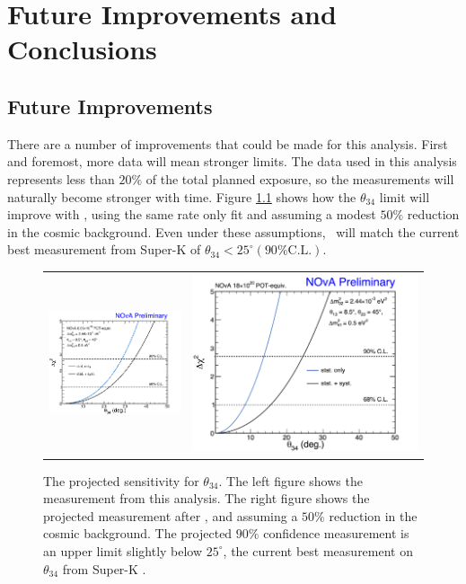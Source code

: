 \chapter{Future Improvements and Conclusions}
\label{conclusion}

\section{Future Improvements}
\label{sec:Future}

There are a number of improvements that could be made for this analysis. First and foremost, more data will mean stronger limits. The data used in this analysis represents less than $20\%$ of the total planned exposure, so the measurements will naturally become stronger with time. Figure \ref{fig:Fit3yr} shows how the $\theta_{34}$ limit will improve with , using the same rate only fit and assuming a modest $50\%$ reduction in the cosmic background. Even under these assumptions, \nova~will match the current best measurement from Super-K \cite{ref:SuperKSterile} of $\theta_{34} < 25^\circ (90\% \mbox{C.L.})$.
\begin{figure}[htb]
  \centering
  \begin{tabular}{c c}
    \includegraphics[width=.47\textwidth]{figures/Fits/1DTh34.png} &
    \includegraphics[width=.47\textwidth]{figures/Fits/1DTh34_3yr.png} \\
  \end{tabular}
  \caption[Projected Sensitivity for $\theta_{34}$ After .]{The projected sensitivity for $\theta_{34}$. The left figure shows the measurement from this analysis. The right figure shows the projected measurement after , and assuming a $50\%$ reduction in the cosmic background. The projected $90\%$ confidence measurement is an upper limit slightly below $25^\circ$, the current best measurement on $\theta_{34}$ from Super-K \cite{ref:SuperKSterile}.}
  \label{fig:Fit3yr}
\end{figure}


